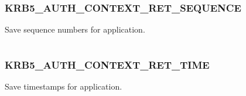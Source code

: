 \documentclass[letterpaper,10pt,english]{sphinxmanual}
\begin{document}
\begin{tabulary}{\linewidth}{|L|L|}
\hline

 & 
\\\hline
\end{tabulary}



\subsubsection{KRB5\_AUTH\_CONTEXT\_RET\_SEQUENCE}
\label{appdev/refs/macros/KRB5_AUTH_CONTEXT_RET_SEQUENCE::doc}\label{appdev/refs/macros/KRB5_AUTH_CONTEXT_RET_SEQUENCE:krb5-auth-context-ret-sequence}\label{appdev/refs/macros/KRB5_AUTH_CONTEXT_RET_SEQUENCE:krb5-auth-context-ret-sequence-data}

\begin{fulllineitems}
\label{appdev/refs/macros/KRB5_AUTH_CONTEXT_RET_SEQUENCE:KRB5_AUTH_CONTEXT_RET_SEQUENCE}
\end{fulllineitems}


Save sequence numbers for application.

\begin{tabulary}{\linewidth}{|L|L|}
\hline

 & 
\\\hline
\end{tabulary}



\subsubsection{KRB5\_AUTH\_CONTEXT\_RET\_TIME}
\label{appdev/refs/macros/KRB5_AUTH_CONTEXT_RET_TIME::doc}\label{appdev/refs/macros/KRB5_AUTH_CONTEXT_RET_TIME:krb5-auth-context-ret-time}\label{appdev/refs/macros/KRB5_AUTH_CONTEXT_RET_TIME:krb5-auth-context-ret-time-data}

\begin{fulllineitems}
\label{appdev/refs/macros/KRB5_AUTH_CONTEXT_RET_TIME:KRB5_AUTH_CONTEXT_RET_TIME}
\end{fulllineitems}


Save timestamps for application.
\end{document}
